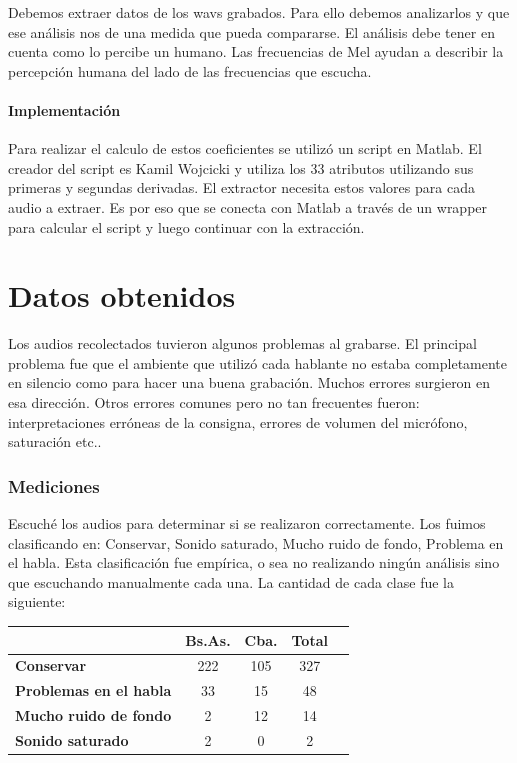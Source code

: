 \documentclass[11pt,a4paper,twoside]{tesis}
\begin{document}
Debemos extraer datos de los wavs grabados. Para ello debemos analizarlos y que ese análisis nos de una medida que pueda compararse. El análisis debe tener en cuenta como lo percibe un humano. Las frecuencias de Mel ayudan a describir la percepción humana del lado de las frecuencias que escucha. 

\subsubsection{Implementación}

Para realizar el calculo de estos coeficientes se utilizó un script en Matlab. El creador del script es Kamil Wojcicki y utiliza los 33 atributos utilizando sus primeras y segundas derivadas. El extractor necesita estos valores para cada audio a extraer. Es por eso que se conecta con Matlab a través de un wrapper para calcular el script y luego continuar con la extracción.

\chapter{Datos obtenidos}

Los audios recolectados tuvieron algunos problemas al grabarse. El principal problema fue que el ambiente que utilizó cada hablante no estaba completamente en silencio como para hacer una buena grabación. Muchos errores surgieron en esa dirección. Otros errores comunes pero no tan frecuentes fueron: interpretaciones erróneas de la consigna, errores de volumen del micrófono, saturación etc.. 

\subsection{Mediciones}

Escuché los audios para determinar si se realizaron correctamente. Los fuimos clasificando en: Conservar, Sonido saturado, Mucho ruido de fondo, Problema en el habla. Esta clasificación fue empírica, o sea no realizando ningún análisis sino que escuchando manualmente cada una. La cantidad de cada clase fue la siguiente:

\begin{table}[h]
\centering
\begin{tabular}{|l|c|c|c|c|}
\hline
\textbf{}  & \textbf{Bs.As. } & \textbf{Cba.} & \textbf{Total} \\ \hline
\textbf{Conservar}  & 222 & 105 & 327 \\ \hline
\textbf{Problemas en el habla}  & 33 & 15 & 48 \\ \hline
\textbf{Mucho ruido de fondo}  & 2 & 12 & 14 \\ \hline
\textbf{Sonido saturado}  & 2 & 0 & 2 \\ \hline
\end{tabular}
\end{table}
\end{document}
